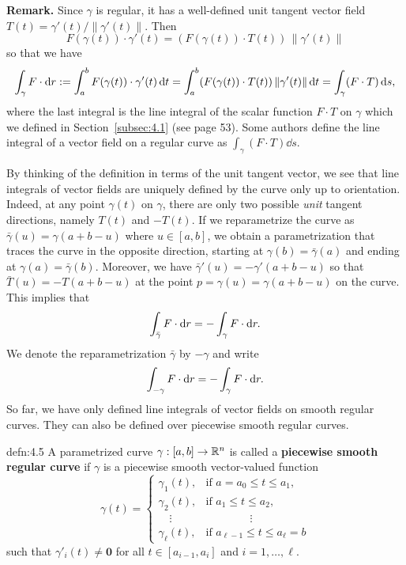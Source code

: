 {\bf Remark.} Since $\gamma$ is regular, it has a well-defined unit tangent 
vector field $T(t) = \gamma'(t)/\|\gamma'(t)\|$. Then 
\[ F(\gamma(t)) \cdot \gamma'(t) = (F(\gamma(t)) \cdot T(t))\,\|\gamma'(t)\| \] 
so that we have 
\[ \int_\gamma F\cdot{\rm d}r := \int_a^b F(\gamma(t)) \cdot \gamma'(t)\,\mathrm{d} t 
= \int_a^b (F(\gamma(t)) \cdot T(t))\,\|\gamma'(t)\|\,\mathrm{d} t = 
\int_\gamma (F \cdot T)\,\mathrm{d} s, \] 
where the last integral is the line integral of the scalar function 
$F \cdot T$ on $\gamma$ which we defined in Section~\ref{subsec:4.1}
(see page 53). Some authors define the line integral of a vector field 
on a regular curve as $\int_\gamma (F \cdot T)\dd s$. 

By thinking of the definition in terms of the unit tangent vector, we see that 
line integrals of vector fields are uniquely defined by the curve only 
up to orientation. Indeed, at any point $\gamma(t)$ on $\gamma$, there are only 
two possible \emph{unit} tangent directions, namely $T(t)$ and $-T(t)$. 
If we reparametrize the curve as $\bar\gamma(u) = \gamma(a+b-u)$ where 
$u \in [a, b]$, we obtain a parametrization that traces the curve in the 
opposite direction, starting at $\gamma(b) = \bar\gamma(a)$ and ending 
at $\gamma(a) = \bar\gamma(b)$. Moreover, we have $\bar\gamma'(u) = 
-\gamma'(a+b-u)$ so that $\bar T(u) = -T(a+b-u)$ at the point 
$p = \gamma(u) = \gamma(a+b-u)$ on the curve. This implies that 
\[ \int_{\bar\gamma} F\cdot{\rm d}r = -\int_\gamma F\cdot{\rm d}r. \] 
We denote the reparametrization $\bar\gamma$ by $-\gamma$ and write 
\[ \int_{-\gamma} F\cdot{\rm d}r = -\int_\gamma F\cdot{\rm d}r. \] 
So far, we have only defined line integrals of vector fields on smooth 
regular curves. They can also be defined over piecewise smooth regular curves. 

\begin{defn}{defn:4.5}
    A parametrized curve $\gamma : [a, b] \to \mathbb{R}^n$ is called a {\bf 
    piecewise smooth regular curve} if $\gamma$ is a piecewise smooth 
    vector-valued function 
    \[ \gamma(t) = \begin{cases}
        \gamma_1(t), & \text{if } a = a_0 \leq t \leq a_1, \\ 
        \gamma_2(t), & \text{if } a_1 \leq t \leq a_2, \\ 
        \quad\vdots & \qquad\qquad \vdots \\ 
        \gamma_\ell(t), & \text{if } a_{\ell-1} \leq t \leq a_\ell = b 
    \end{cases} \] 
    such that $\gamma'_i(t) \neq \mathbf 0$ for all $t \in [a_{i-1}, a_i]$ 
    and $i = 1, \dots, \ell$. 
\end{defn}\vspace{-0.25cm}

